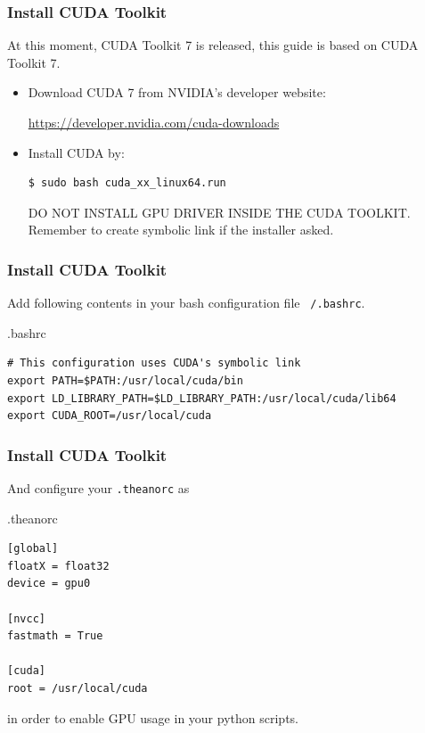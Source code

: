 \documentclass{beamer}
\begin{document}
\begin{frame}[fragile]
\frametitle{Install CUDA Toolkit}

At this moment, CUDA Toolkit 7 is released, this guide is based on CUDA Toolkit 7.

\begin{itemize}
\item[\ding{43}] Download CUDA 7 from NVIDIA's developer website:

\url{https://developer.nvidia.com/cuda-downloads}

\item[\ding{43}] Install CUDA by:
\begin{verbatim}
$ sudo bash cuda_xx_linux64.run
\end{verbatim}
DO NOT INSTALL GPU DRIVER INSIDE THE CUDA TOOLKIT. Remember to create symbolic link if the installer asked.

\end{itemize}

\end{frame}

\begin{frame}[fragile]
\frametitle{Install CUDA Toolkit}

Add following contents in your bash configuration file \texttt{~/.bashrc}.
\small
\begin{block}{.bashrc}
\begin{verbatim}
# This configuration uses CUDA's symbolic link
export PATH=$PATH:/usr/local/cuda/bin
export LD_LIBRARY_PATH=$LD_LIBRARY_PATH:/usr/local/cuda/lib64
export CUDA_ROOT=/usr/local/cuda
\end{verbatim}
\end{block}

\end{frame}

\begin{frame}[fragile]
\frametitle{Install CUDA Toolkit}
And configure your \texttt{.theanorc} as
\begin{block}{.theanorc}
\begin{verbatim}
[global]
floatX = float32
device = gpu0

[nvcc]
fastmath = True

[cuda]
root = /usr/local/cuda
\end{verbatim}
\end{block}
in order to enable GPU usage in your python scripts.
\end{frame}
\end{document}
